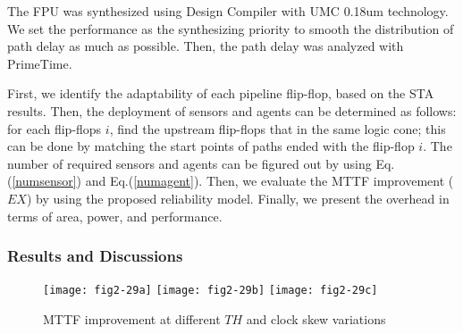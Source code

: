 The FPU was synthesized using Design Compiler with UMC
0.18um technology. We set the performance as the synthesizing priority to smooth the distribution
of path delay as much as possible. Then, the path delay was analyzed with PrimeTime.

First, we identify the adaptability of each pipeline flip-flop, based on the STA results. Then, the
deployment of sensors and agents can be determined as follows: for each flip-flops $i$, find the
upstream flip-flops that in the same logic cone; this can be done by matching the start points of
paths ended with the flip-flop $i$. The number of required sensors and agents can be figured out by
using Eq.(\ref{numsensor}) and Eq.(\ref{numagent}).
Then, we evaluate the MTTF improvement ($EX$) by using the proposed reliability model.
Finally, we present the overhead in terms of area, power, and performance.

\subsubsection{Results and Discussions}\label{section_results}

\begin{figure*}[t]
\centering {}%
{\texttt{[image: fig2-29a]}} \hspace{-0.4cm}
{\texttt{[image: fig2-29b]}} \hspace{-0.4cm}
{\texttt{[image: fig2-29c]}} \hspace{-0.4cm}
\vspace{-0.2cm}
\caption{MTTF improvement at different $TH$ and clock skew variations}\label{ex}
\end{figure*}

